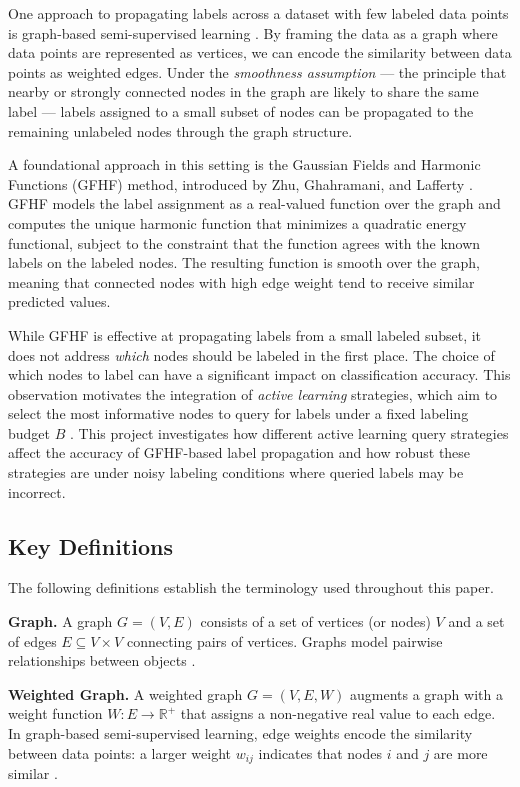 \documentclass[12pt]{article}
\begin{document}
One approach to propagating labels across a dataset with few labeled data points is graph-based semi-supervised learning \cite{Zhu2005}. By framing the data as a graph where data points are represented as vertices, we can encode the similarity between data points as weighted edges. Under the \textit{smoothness assumption} --- the principle that nearby or strongly connected nodes in the graph are likely to share the same label \cite{Chapelle2006, Zhu2005} --- labels assigned to a small subset of nodes can be propagated to the remaining unlabeled nodes through the graph structure.

A foundational approach in this setting is the Gaussian Fields and Harmonic Functions (GFHF) method, introduced by Zhu, Ghahramani, and Lafferty \cite{Zhu2003}. GFHF models the label assignment as a real-valued function over the graph and computes the unique harmonic function that minimizes a quadratic energy functional, subject to the constraint that the function agrees with the known labels on the labeled nodes. The resulting function is smooth over the graph, meaning that connected nodes with high edge weight tend to receive similar predicted values.

While GFHF is effective at propagating labels from a small labeled subset, it does not address \textit{which} nodes should be labeled in the first place. The choice of which nodes to label can have a significant impact on classification accuracy. This observation motivates the integration of \textit{active learning} strategies, which aim to select the most informative nodes to query for labels under a fixed labeling budget $B$ \cite{Settles2012}. This project investigates how different active learning query strategies affect the accuracy of GFHF-based label propagation and how robust these strategies are under noisy labeling conditions where queried labels may be incorrect.

\subsection{Key Definitions}

The following definitions establish the terminology used throughout this paper.

\textbf{Graph.} A graph $G = (V, E)$ consists of a set of vertices (or nodes) $V$ and a set of edges $E \subseteq V \times V$ connecting pairs of vertices. Graphs model pairwise relationships between objects \cite{Diestel2017}.

\textbf{Weighted Graph.} A weighted graph $G = (V, E, W)$ augments a graph with a weight function $W: E \rightarrow \mathbb{R}^+$ that assigns a non-negative real value to each edge. In graph-based semi-supervised learning, edge weights encode the similarity between data points: a larger weight $w_{ij}$ indicates that nodes $i$ and $j$ are more similar \cite{Zhu2003}.
\end{document}
